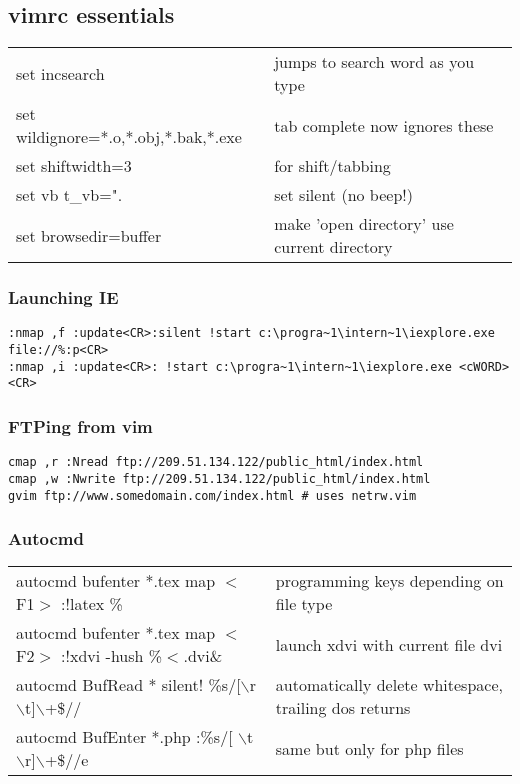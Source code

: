 \subsection{vimrc essentials}
\begin{center}
\begin{longtable}{l|l}
set incsearch & jumps to search word as you type\\
set wildignore=*.o,*.obj,*.bak,*.exe & tab complete now ignores these\\
set shiftwidth=3 & for shift/tabbing\\
set vb t\_vb=". & set silent (no beep!)\\
set browsedir=buffer & make 'open directory' use current directory\\
\end{longtable}
\end{center}

\subsubsection{Launching IE}

\begin{verbatim}
:nmap ,f :update<CR>:silent !start c:\progra~1\intern~1\iexplore.exe file://%:p<CR>
:nmap ,i :update<CR>: !start c:\progra~1\intern~1\iexplore.exe <cWORD><CR>
\end{verbatim}

\subsubsection{FTPing from vim}

\begin{verbatim}
cmap ,r :Nread ftp://209.51.134.122/public_html/index.html
cmap ,w :Nwrite ftp://209.51.134.122/public_html/index.html
gvim ftp://www.somedomain.com/index.html # uses netrw.vim
\end{verbatim}

\subsubsection{Autocmd}
\begin{center}
\begin{longtable}{l|l}
autocmd bufenter *.tex map $<$F1$>$ :!latex \% & programming keys depending on file type\\
autocmd bufenter *.tex map $<$F2$>$ :!xdvi -hush \%$<$.dvi\&  & launch xdvi with current file dvi\\
autocmd BufRead * silent! \%s/[$\backslash$r $\backslash$t]$\backslash$+\$// & automatically delete whitespace, trailing dos returns\\
autocmd BufEnter *.php :\%s/[ $\backslash$t$\backslash$r]$\backslash$+\$//e & same but only for php files
\end{longtable}
\end{center}

